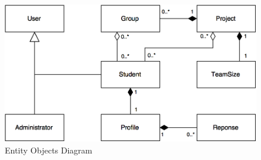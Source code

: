 \documentclass[12pt,letterpaper]{article}
\begin{document}
\begin{figure}[H]
	\centering{}
	\includegraphics[scale=0.4]{imgs/entity-object-diagram.png}
	\caption{Entity Objects Diagram}
\end{figure}
\end{document}
